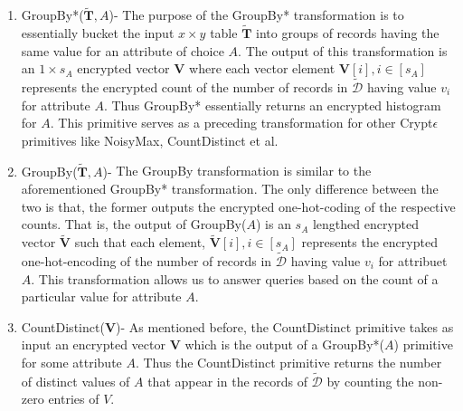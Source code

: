 \begin{enumerate}
    \item{\textsf{GroupBy*}($\mathbf{\tilde{T}},A$)}- The purpose of the \textsf{GroupBy*} transformation is to essentially bucket the input $x\times y$ table $\mathbf{\tilde{T}}$ into groups of records having the same value for an attribute of choice $A$. The output of this transformation is an $1\times s_A$ encrypted  vector $\mathbf{V}$  where each vector element $\mathbf{V}[i], i \in [s_A]$ represents the encrypted count of the number of records in $\boldsymbol{\tilde{\mathcal{D}}}$ having value $v_{i}$ for attribute $A$. Thus \textsf{GroupBy*} essentially returns an encrypted histogram for $A$.
    This primitive serves as a preceding transformation for other Crypt$\epsilon$ primitives like \textsf{NoisyMax}, \textsf{CountDistinct} et al.
     \item{\textsf{GroupBy}($\mathbf{\tilde{T}},A$)-} The \textsf{GroupBy} transformation is similar to the aforementioned \textsf{GroupBy*} transformation. The only difference between the two is that, the former outputs the encrypted one-hot-coding of the respective counts. That is, the output of \textsf{GroupBy}($A$)  is an $s_A$ lengthed encrypted vector $\tilde{\mathbf{V}}$ such that each element, $\tilde{\mathbf{V}}[i], i \in [s_A]$ represents the encrypted one-hot-encoding of the number of records in $\boldsymbol{\tilde{\mathcal{D}}}$ having value $v_{i}$ for attribuet $A$. This transformation allows us to answer queries based on the count of a particular value for attribute $A$.
     \item {\textsf{CountDistinct}($\mathbf{V}$)-} As mentioned before, the \textsf{CountDistinct} primitive takes as input an encrypted vector $\mathbf{V}$ which is the output of a \textsf{GroupBy*}($A$) primitive for some attribute $A$. Thus the \textsf{CountDistinct} primitive  returns the number of distinct values of $A$ that appear in the records of $\boldsymbol{\tilde{\mathcal{D}}}$ by counting the non-zero entries of $V$.  
\end{enumerate}
